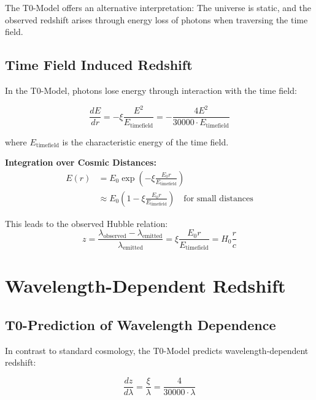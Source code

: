 \documentclass[12pt,a4paper]{report}
\newcommand{\xipar}{\xi}      %
\begin{document}
	The T0-Model offers an alternative interpretation: The universe is static, and the observed redshift arises through energy loss of photons when traversing the time field.
	
	\subsection{Time Field Induced Redshift}\label{subsec:timefield_redshift}
	
	In the T0-Model, photons lose energy through interaction with the time field:
	
	\begin{equation}\label{eq:photon_energy_loss}
		\frac{dE}{dr} = -\xipar \frac{E^2}{E_{\text{timefield}}} = -\frac{4E^2}{30000 \cdot E_{\text{timefield}}}
	\end{equation}
	
	where $E_{\text{timefield}}$ is the characteristic energy of the time field.
	
	\textbf{Integration over Cosmic Distances:}
	\begin{align}
		E(r) &= E_0 \exp\left(-\xipar \frac{E_0 r}{E_{\text{timefield}}}\right) \\
		&\approx E_0 \left(1 - \xipar \frac{E_0 r}{E_{\text{timefield}}}\right) \quad \text{for small distances}
	\end{align}
	
	This leads to the observed Hubble relation:
	\begin{equation}\label{eq:hubble_relation_t0}
		z = \frac{\lambda_{\text{observed}} - \lambda_{\text{emitted}}}{\lambda_{\text{emitted}}} = \xipar \frac{E_0 r}{E_{\text{timefield}}} = H_0 \frac{r}{c}
	\end{equation}
	
	\section{Wavelength-Dependent Redshift}\label{sec:wavelength_dependent_redshift}
	
	\subsection{T0-Prediction of Wavelength Dependence}\label{subsec:t0_wavelength_dependence}
	
	In contrast to standard cosmology, the T0-Model predicts wavelength-dependent redshift:
	
	\begin{equation}
		\frac{dz}{d\lambda} = \frac{\xipar}{\lambda} = \frac{4}{30000 \cdot \lambda}
	\end{equation}
	
\end{document}
